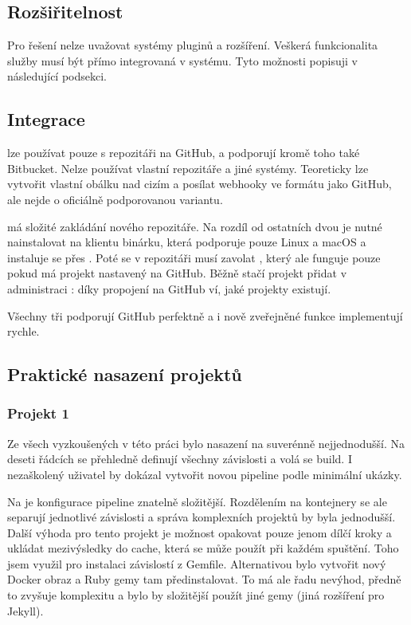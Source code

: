     \subsection{Rozšiřitelnost}
        Pro  řešení nelze uvažovat systémy pluginů a rozšíření. Veškerá funkcionalita služby musí být přímo integrovaná v systému. Tyto možnosti popisuji v následující podsekci.

    \subsection{Integrace}
        \travis lze používat pouze s repozitáři na GitHub, \circleci a \semaphore podporují kromě toho také Bitbucket. Nelze používat vlastní repozitáře a jiné systémy. Teoreticky lze vytvořit vlastní obálku nad cizím  a posílat webhooky ve formátu jako GitHub, ale nejde o oficiálně podporovanou variantu.

        \semaphore má složité zakládání nového repozitáře. Na rozdíl od ostatních dvou \CI je nutné nainstalovat na klientu binárku, která podporuje pouze Linux a macOS a instaluje se přes . Poté se v repozitáři musí zavolat , který ale funguje pouze pokud má projekt nastavený  na GitHub. Běžně stačí projekt přidat v administraci \CI: díky propojení na GitHub \CI ví, jaké projekty existují.

        Všechny tři \CI podporují GitHub perfektně a i nově zveřejněné funkce implementují rychle.

    \subsection{Praktické nasazení projektů}
        \subsubsection{Projekt 1}
            Ze všech \CI vyzkoušených v této práci bylo nasazení na \travis suverénně nejjednodušší. Na deseti řádcích se přehledně definují všechny závislosti a volá se build. I nezaškolený uživatel by dokázal vytvořit novou pipeline podle minimální ukázky.

            Na \circleci je konfigurace pipeline znatelně složitější. Rozdělením na kontejnery se ale separují jednotlivé závislosti a správa komplexních projektů by byla jednodušší. Další výhoda \circleci pro tento projekt je možnost opakovat pouze jenom dílčí kroky a ukládat mezivýsledky do cache, která se může použít při každém spuštění. Toho jsem využil pro instalaci závislostí z Gemfile. Alternativou bylo vytvořit nový Docker obraz a Ruby gemy tam předinstalovat. To má ale řadu nevýhod, předně to zvyšuje komplexitu a bylo by složitější použít jiné gemy (jiná rozšíření pro Jekyll).

